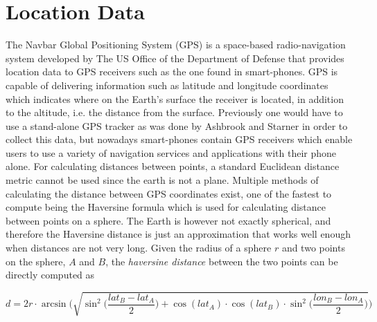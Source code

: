 \section{Location Data}
The Navbar Global Positioning System (GPS) is a space-based radio-navigation system developed by The US Office of the Department of Defense \cite{gps-navstar} that provides location data to GPS receivers such as the one found in smart-phones. GPS is capable of delivering information such as latitude and longitude coordinates which indicates where on the Earth's surface the receiver is located, in addition to the altitude, i.e. the distance from the surface. Previously one would have to use a stand-alone GPS tracker as was done by Ashbrook and Starner \cite{using_gps_to_learn_significant_locations} in order to collect this data, but nowadays smart-phones contain GPS receivers which enable users to use a variety of navigation services and applications with their phone alone. For calculating distances between points, a standard Euclidean distance metric cannot be used since the earth is not a plane. Multiple methods of calculating the distance between GPS coordinates exist, one of the fastest to compute being the Haversine formula \cite{haversine-formula} which is used for calculating distance between points on a sphere. The Earth is however not exactly spherical, and therefore the Haversine distance is just an approximation that works well enough when distances are not very long. Given the radius of a sphere $r$ and two points on the sphere, $A$ and $B$, the \textit{haversine distance} between the two points can be directly computed as 

\begin{equation}
\label{eq:haversine}
d = 2r \cdot \arcsin \Bigg( \sqrt{\sin^2 \bigg( \frac{lat_B - lat_A}{2} \bigg) + \cos(lat_A) \cdot \cos(lat_B) \cdot \sin^2 \bigg(\frac{ lon_B - lon_A}{2} \bigg)}\Bigg)
\end{equation}

